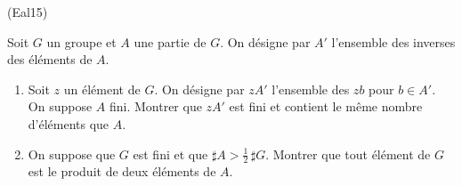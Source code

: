 \begin{tiny}(Eal15)\end{tiny} Soit $G$ un groupe et $A$ une partie de $G$. On désigne par $A'$ l'ensemble des inverses des éléments de $A$.
\begin{enumerate}
 \item Soit $z$ un élément de $G$. On désigne par $zA'$ l'ensemble des $zb$ pour $b\in A'$. On suppose $A$ fini. Montrer que $zA'$ est fini et contient le même nombre d'éléments que $A$.
 \item On suppose que $G$ est fini et que $\sharp A > \frac{1}{2}\,\sharp G$. Montrer que tout élément de $G$ est le produit de deux éléments de $A$. 
\end{enumerate}
